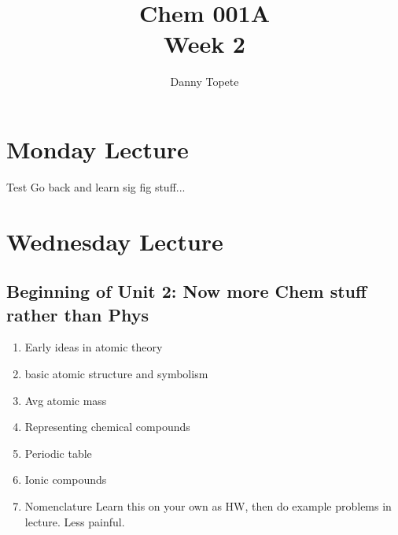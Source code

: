 \documentclass{article}
\title{Chem 001A\\ Week 2}
\author{Danny Topete}
\begin{document}
\maketitle{}
\section{Monday Lecture}
Test
Go back and learn sig fig stuff...

\section{Wednesday Lecture}
\subsection{Beginning of Unit 2: Now more Chem stuff rather than Phys}
\begin{enumerate}
  \item Early ideas in atomic theory
  \item basic atomic structure and symbolism
  \item Avg atomic mass
  \item Representing chemical compounds
  \item Periodic table
  \item Ionic compounds
  \item Nomenclature
    \rightarrow{} Learn this on your own as HW, then
    do example problems in lecture. Less painful.
\end{enumerate}
\end{document}
